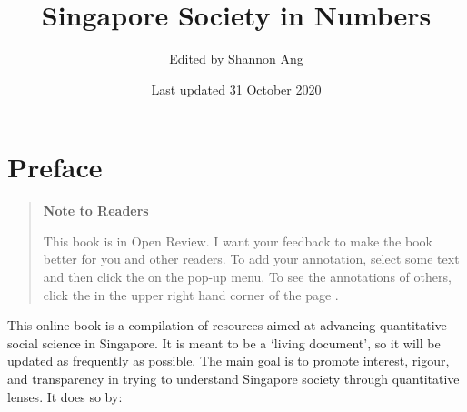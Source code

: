 \documentclass[
  openany]{book}
\title{Singapore Society in Numbers}
\author{Edited by Shannon Ang}
\date{Last updated 31 October 2020}
\begin{document}
\maketitle

{
\setcounter{tocdepth}{1}
\tableofcontents
}
\hypertarget{preface}{%
\chapter*{Preface}\label{preface}}

\begin{quote}
\textbf{Note to Readers}

This book is in Open Review. I want your feedback to make the book better for you and other readers. To add your annotation, {select some text} and then click the on the pop-up menu. To see the annotations of others, click the in the upper right hand corner of the page .
\end{quote}

This online book is a compilation of resources aimed at advancing quantitative social science in Singapore. It is meant to be a `living document', so it will be updated as frequently as possible. The main goal is to promote interest, rigour, and transparency in trying to understand Singapore society through quantitative lenses. It does so by:
\end{document}
